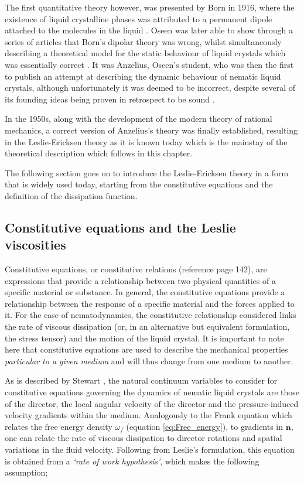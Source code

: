 The first quantitative theory however, was presented by Born in 1916, where the existence of liquid crystalline phases was attributed to a permanent dipole attached to the molecules in the liquid \cite{Taylor1999}. Oseen was later able to show through a series of articles that Born's dipolar theory was wrong, whilst simultaneously describing a theoretical model for the static behaviour of liquid crystals which was essentially correct \cite{Taylor1999}. It was Anzelius, Oseen's student, who was then the first to publish an attempt at describing the dynamic behaviour of nematic liquid crystals, although unfortunately it was deemed to be incorrect, despite several of its founding ideas being proven in retrospect to be sound \cite{Taylor1999}. 

In the 1950s, along with the development of the modern theory of rational mechanics, a correct version of Anzelius's theory was finally established, resulting in the Leslie-Ericksen theory as it is known today \cite{Taylor1999} which is the mainstay of the theoretical description which follows in this chapter. 

The following section goes on to introduce the Leslie-Ericksen theory in a form that is widely used today, starting from the constitutive equations and the definition of the dissipation function.

\subsection{Constitutive equations and the Leslie viscosities}

\label{sec:con_eq}
Constitutive equations, or constitutive relations (reference \cite{Stewart2004} page 142), are expressions that provide a relationship between two physical quantities of a specific material or substance. In general, the constitutive equations provide a relationship between the response of a specific material and the forces applied to it. For the case of nematodynamics, the constitutive relationship considered links the rate of viscous dissipation (or, in an alternative but equivalent formulation, the stress tensor) and the motion of the liquid crystal. It is important to note here that constitutive equations are used to describe the mechanical properties \textit{particular to a given medium} and will thus change from one medium to another. 

As is described by Stewart \cite{Stewart2004}, the natural continuum variables to consider for constitutive equations governing the dynamics of nematic liquid crystals are those of the director, the local angular velocity of the director and the pressure-induced velocity gradients within the medium. Analogously to the Frank equation which relates the free energy density $\omega_f$ (equation \ref{eq:Free_energy}), to gradients in $\mathbf{n}$, one can relate the rate of viscous dissipation to director rotations and spatial variations in the fluid velocity. Following from Leslie's \cite{Leslie1992} formulation, this equation is obtained from a \textit{`rate of work hypothesis'}, which makes the following assumption; 

